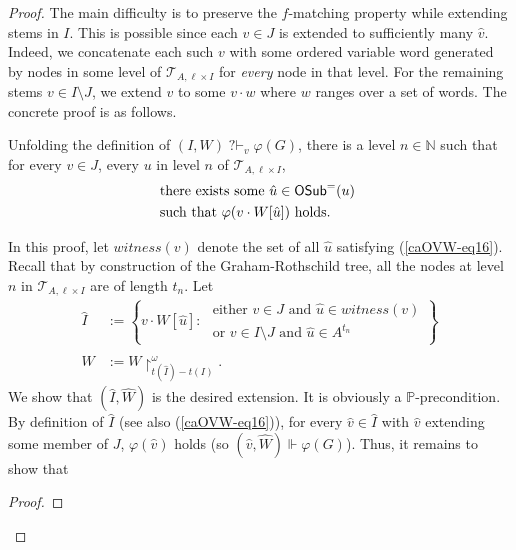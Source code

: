 \documentclass[10pt,a4paper]{amsart}
\def\PP{\mathbb{P}}
\def\h{\hat}
\def\mcal{\mathcal}
\def\sufficient{matching}
\def\uhr{\upharpoonright}
\def\vwsamelong{\mathsf{OSub}^=}
\newcommand{\NN}[0]{\mathbb{N}}
\newcommand{\qvdash}{\operatorname{{?}{\vdash}}}
\begin{document}
\begin{proof}
 The main difficulty is to preserve
 the $f$-matching property while extending stems in $I$.
 This is possible since each $v\in J$ is extended
 to sufficiently many $\h v$. Indeed, we concatenate each such $v$ with some
 ordered variable word generated by nodes in some level of $\mcal T_{A, \ell \times I}$
 for \emph{every} node in that level.
 For the remaining stems $v\in I\setminus J$, we extend $v$ to some
 $v\cdot w$ where $w$ ranges over a set of words.
 The concrete proof is as follows.

Unfolding the definition of
$(I,W)\qvdash_v\varphi(G)$, there is a level $n \in \NN$
such that
for every $v\in J$,
every $u$ in level $n$ of  $\mcal T_{A, \ell \times I}$,
\begin{align}
\label{caOVW-eq16}
&\text{there exists some $\h u\in \vwsamelong(u) $
}\\ \nonumber
&\text{such that
$\varphi(v\cdot W[\h u])$ holds.}
\end{align}

In this proof,
let $witness(v)$ denote the set of all  $\h u$ satisfying (\ref{caOVW-eq16}).
Recall that by construction of the Graham-Rothschild tree, all the nodes at level $n$ in $\mcal T_{A, \ell \times I}$
are of length $t_n$.
Let
\begin{align}\label{caOVW-eq17}
\h I & := \left\{ v\cdot W[\hat u] : \begin{array}{l}
    \text{ either }v\in J\text{ and } \h u\in witness(v)\\
  \text{ or } v\in I\setminus J\text{ and }\hat u\in A^{t_n}
  \end{array} \right\} \\
\h W & :=  W \uhr_{t(\h I)-t(I)}^\omega. \nonumber
\end{align}
We show that $(\h I,\h W)$ is the desired extension.
It is obviously a $\PP$-precondition.
By definition of $\h I$ (see also (\ref{caOVW-eq16})),
for every $\h v\in \h I$ with $\h v$ extending
some member of $J$, $\varphi(\h v)
$ holds (so $(\h v,\h W)\Vdash\varphi(G)$).
Thus, it remains to show that
\begin{proof}


\end{proof}
\end{proof}
\end{document}
